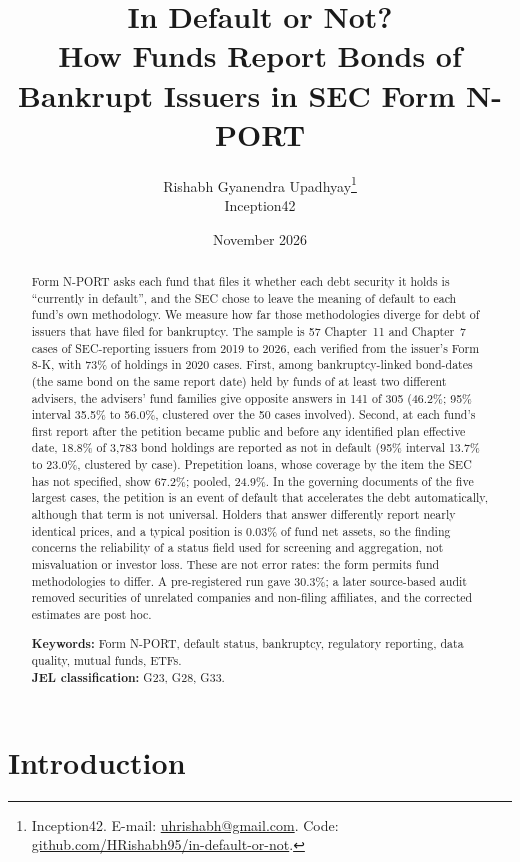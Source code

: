\documentclass[11pt]{article}
\title{\textbf{In Default or Not?}\\[2pt]
\Large How Funds Report Bonds of Bankrupt Issuers in SEC Form N-PORT}
\author{Rishabh Gyanendra Upadhyay\thanks{Inception42. E-mail:
\href{mailto:uhrishabh@gmail.com}{uhrishabh@gmail.com}.
Code: \href{https://github.com/HRishabh95/in-default-or-not}{github.com/HRishabh95/in-default-or-not}.}\\[2pt] \normalsize Inception42}
\date{November 2026}
\begin{document}
\maketitle
\thispagestyle{empty}

\begin{abstract}
\noindent Form N-PORT asks each fund that files it whether each debt security it holds is ``currently in
default'', and the SEC chose to leave the meaning of default to each fund's own methodology. We measure
how far those methodologies diverge for debt of issuers that have filed for bankruptcy. The sample is
57 Chapter~11 and Chapter~7 cases of SEC-reporting issuers from 2019 to 2026, each verified from the
issuer's Form 8-K, with 73\% of holdings in 2020 cases. First, among bankruptcy-linked bond-dates
(the same bond on the same report date) held by funds of at least two different advisers, the advisers'
fund families give opposite answers in 141 of 305 (46.2\%; 95\% interval 35.5\% to 56.0\%, clustered
over the 50 cases involved). Second, at each fund's first report after the petition became public and before any identified plan
effective date, 18.8\% of 3,783 bond holdings are reported as not in default (95\% interval 13.7\% to
23.0\%, clustered by case). Prepetition loans, whose coverage by the item the SEC has not specified,
show 67.2\%; pooled, 24.9\%. In the governing documents of the five largest cases, the petition is an
event of default that accelerates the debt automatically, although that term is not universal.
Holders that answer differently report nearly identical prices, and a typical position is 0.03\% of
fund net assets, so the finding concerns the reliability of a status field used for screening and
aggregation, not misvaluation or investor loss. These are not error rates: the form permits fund
methodologies to differ. A pre-registered run gave 30.3\%; a later source-based audit removed
securities of unrelated companies and non-filing affiliates, and the corrected estimates are post hoc.

\medskip\noindent\textbf{Keywords:} Form N-PORT, default status, bankruptcy, regulatory reporting,
data quality, mutual funds, ETFs.\\
\textbf{JEL classification:} G23, G28, G33.
\end{abstract}

\newpage
\setcounter{page}{1}

\section{Introduction}
\end{document}
